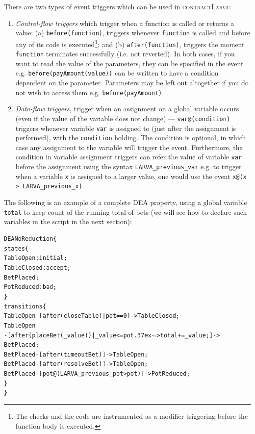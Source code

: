 \documentclass{article}
\newcommand{\contractlarva}{\textsc{contractLarva}\xspace}
\newcommand{\tildearrow}{{\raise.37ex\hbox{$\scriptstyle\mathtt{\sim}$}}>\xspace}
\begin{document}
  \noindent There are two types of event triggers which can be used in \contractlarva:
  \begin{enumerate}[label=(\roman*)]
    \item \emph{Control-flow triggers} which trigger when a function is called or returns a value: (a) \texttt{before(function)}, triggers whenever \texttt{function} is called and before any of its code is executed\footnote{The checks and the code are instrumented as a modifier triggering before the function body is executed.}; and  (b) \texttt{after(function)}, triggers the moment \texttt{function} terminates successfully (i.e. not reverted). In both cases, if you want to read the value of the parameters, they can be specified in the event e.g. \texttt{before(payAmount(value))} can be written to have a condition dependent on the parameter. Parameters may be left out altogether if you do not wish to access them e.g.  \texttt{before(payAmount)}.
    \item \emph{Data-flow triggers}, trigger when an assignment on a global variable occurs (even if the value of the variable does not change) --- \texttt{var@(condition)}  triggers whenever variable \texttt{var} is assigned to (just after the assignment is performed), with the \texttt{condition} holding. The condition is optional, in which case any assignment to the variable will trigger the event. Furthermore, the condition in variable assignment triggers can refer the value of variable \texttt{var} before the assignment using the syntax \texttt{LARVA\_previous\_var} e.g. to trigger when a variable \texttt{x} is assigned to a larger value, one would use the event \texttt{x@(x > LARVA\_previous\_x)}.
  \end{enumerate}
      
  \noindent The following is an example of a complete DEA property, using a global variable \texttt{total} to keep count of the running total of bets (we will see how to declare such variables in the script in the next section):
  
  \small\begin{alltt}
  DEA NoReduction \{
    states \{
      TableOpen: initial;
      TableClosed: accept;
      BetPlaced;
      PotReduced: bad;
    \}
    transitions \{
      TableOpen -[after(closeTable) | pot == 0 ]-> TableClosed;
      TableOpen 
        -[after(placeBet(\_value)) | \_value <= pot \tildearrow total += \_value;]-> 
          BetPlaced;
      BetPlaced -[after(timeoutBet)]-> TableOpen;
      BetPlaced -[after(resolveBet)]-> TableOpen;
      BetPlaced -[pot@(LARVA\_previous\_pot > pot)]-> PotReduced;
    \}
  \}
  \end{alltt}\normalsize
 
\end{document}
